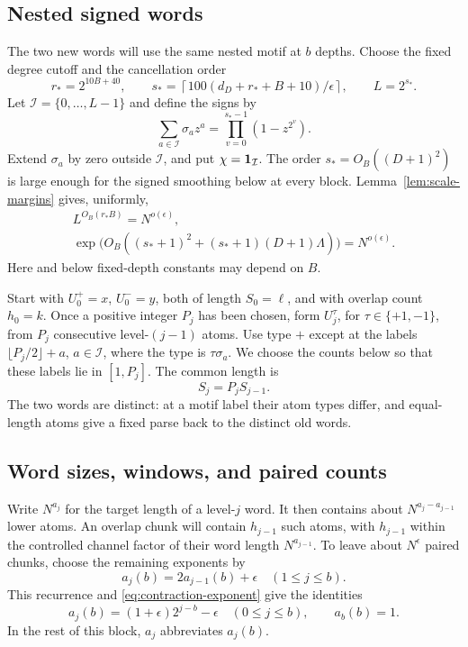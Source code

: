 \subsection{Nested signed words}

The two new words will use the same nested motif at $b$ depths.  Choose the fixed degree cutoff and the cancellation order
\[
 r_*=2^{10B+40},\qquad
 s_*=\left\lceil100(d_D+r_*+B+10)/\epsilon\right\rceil,
 \qquad L=2^{s_*}.
\]
Let $\mathcal I=\{0,\ldots,L-1\}$ and define the signs by
\[
 \sum_{a\in\mathcal I}\sigma_a z^a
       =\prod_{v=0}^{s_*-1}(1-z^{2^v}).
\]
Extend $\sigma_a$ by zero outside $\mathcal I$, and put $\chi={\bf1}_{\mathcal I}$.  The order $s_*=O_B((D+1)^2)$ is large enough for the signed smoothing below at every block.  Lemma~\ref{lem:scale-margins} gives, uniformly,
\begin{equation}\label{eq:block-losses}
\begin{gathered}
 L^{O_B(r_*B)}=N^{o(\epsilon)},\\
 \exp\bigl(O_B((s_*+1)^2+(s_*+1)(D+1)\Lambda)\bigr)
       =N^{o(\epsilon)}.
\end{gathered}
\end{equation}
Here and below fixed-depth constants may depend on $B$.

Start with $U_0^+=x$, $U_0^-=y$, both of length $S_0=\ell$, and with overlap count $h_0=k$.  Once a positive integer $P_j$ has been chosen, form $U_j^\tau$, for $\tau\in\{+1,-1\}$, from $P_j$ consecutive level-$(j-1)$ atoms.  Use type $+$ except at the labels
$\lfloor P_j/2\rfloor+a$, $a\in\mathcal I$, where the type is $\tau\sigma_a$.  We choose the counts below so that these labels lie in $[1,P_j]$.  The common length is
\[
 S_j=P_jS_{j-1}.
\]
The two words are distinct: at a motif label their atom types differ, and equal-length atoms give a fixed parse back to the distinct old words.

\subsection{Word sizes, windows, and paired counts}

Write $N^{a_j}$ for the target length of a level-$j$ word.  It then contains about $N^{a_j-a_{j-1}}$ lower atoms.  An overlap chunk will contain $h_{j-1}$ such atoms, with $h_{j-1}$ within the controlled channel factor of their word length $N^{a_{j-1}}$.  To leave about $N^\epsilon$ paired chunks, choose the remaining exponents by
\[
 a_j(b)=2a_{j-1}(b)+\epsilon\quad(1\le j\le b).
\]
This recurrence and \eqref{eq:contraction-exponent} give the identities
\begin{equation}\label{eq:local-exponents}
 a_j(b)=(1+\epsilon)2^{j-b}-\epsilon\quad(0\le j\le b),
 \qquad a_b(b)=1.
\end{equation}
In the rest of this block, $a_j$ abbreviates $a_j(b)$.

